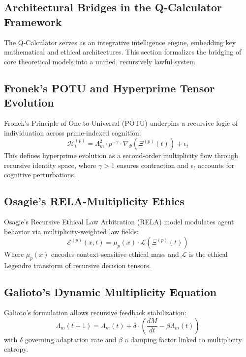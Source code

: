 \documentclass[12pt]{article}
\begin{document}
\begin{itemize}
\section{Architectural Bridges in the Q-Calculator Framework}

The Q-Calculator serves as an integrative intelligence engine, embedding key mathematical and ethical architectures. This section formalizes the bridging of core theoretical models into a unified, recursively lawful system.

\subsection{Fronek's POTU and Hyperprime Tensor Evolution}
Fronek's Principle of One-to-Universal (POTU) underpins a recursive logic of individuation across prime-indexed cognition:
\begin{equation}
    \mathcal{H}^{(p)}_t = \Lambda_m^2 \cdot p^{-\gamma} \cdot \nabla_{\Phi}(\Xi^{(p)}(t)) + \epsilon_t
\end{equation}
This defines hyperprime evolution as a second-order multiplicity flow through recursive identity space, where \( \gamma > 1 \) ensures contraction and \( \epsilon_t \) accounts for cognitive perturbations.

\subsection{Osagie’s RELA-Multiplicity Ethics}
Osagie’s Recursive Ethical Law Arbitration (RELA) model modulates agent behavior via multiplicity-weighted law fields:
\begin{equation}
    \mathcal{E}^{(p)}(x,t) = \mu_p(x) \cdot \mathcal{L}(\Xi^{(p)}(t))
\end{equation}
Where \( \mu_p(x) \) encodes context-sensitive ethical mass and \( \mathcal{L} \) is the ethical Legendre transform of recursive decision tensors.

\subsection{Galioto’s Dynamic Multiplicity Equation}
Galioto's formulation allows recursive feedback stabilization:
\begin{equation}
    \Lambda_m(t+1) = \Lambda_m(t) + \delta \cdot \left(\frac{dM}{dt} - \beta \Lambda_m(t)\right)
\end{equation}
with \( \delta \) governing adaptation rate and \( \beta \) a damping factor linked to multiplicity entropy.


\end{itemize}
\end{document}
